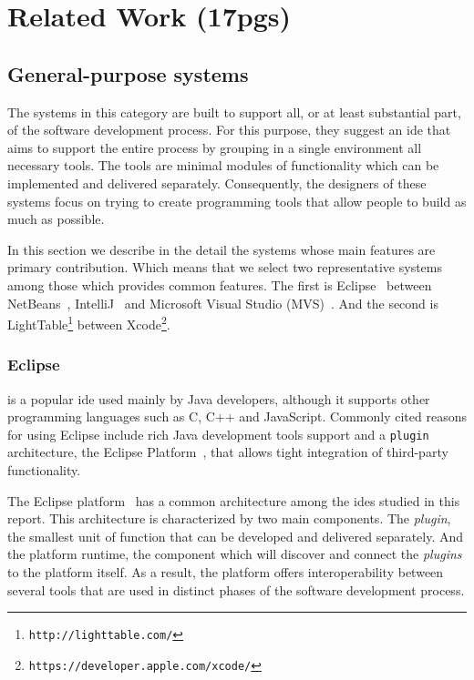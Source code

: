 
% 
% 

\section{Related Work (17pgs)}
\label{sec:rw}

\subsection{General-purpose systems}

The systems in this category are built to support all, or at least substantial part, of the software development process. For this purpose, they suggest an \ac{ide} that aims to support the entire process by grouping in a single environment all necessary tools. The tools are minimal modules of functionality which can be implemented and delivered separately. Consequently, the designers of these systems focus on trying to create programming tools that allow people to build as much as possible.

In this section we describe in the detail the systems whose main features are primary contribution. Which means that we select two representative systems among those which provides common features. The first is Eclipse~\cite{carlson2005eclipse} between NetBeans~\cite{boudreau2002netbeans}, IntelliJ~\cite{intellij2001intellij} and Microsoft Visual Studio (MVS)~\cite{guckenheimer2006software}. And the second is LightTable\footnote{\label{lt:note}\texttt{http://lighttable.com/}} between Xcode\footnote{\texttt{https://developer.apple.com/xcode/}}.
\subsubsection{Eclipse~\cite{carlson2005eclipse}} is a popular \ac{ide} used mainly by Java developers, although it supports other programming languages such as C, C++ and JavaScript. Commonly cited reasons for using Eclipse include rich Java development tools support and a \texttt{plugin} architecture, the Eclipse Platform~\cite{DesRivieres2004}, that allows tight integration of third-party functionality.

The Eclipse platform~\cite{DesRivieres2004} has a common architecture among the \ac{ide}s studied in this report. This architecture is characterized by two main components. The \textit{plugin}, the smallest unit of function that can be developed and delivered separately. And the platform runtime, the component which will discover and connect the \textit{plugins} to the platform itself. As a result, the platform offers interoperability between several tools that are used in distinct phases of the software development process.

